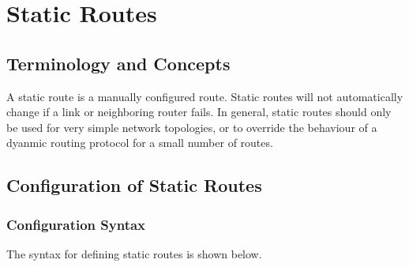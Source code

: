 \chapter{Static Routes}
\label{staticroutes}
\section{Terminology and Concepts}

A static route is a manually configured route.  Static routes will not
automatically change if a link or neighboring router fails.  In
general, static routes should only be used for very simple network
topologies, or to override the behaviour of a dyanmic routing protocol
for a small number of routes.

\section{Configuration of Static Routes}

\subsection{Configuration Syntax}

The syntax for defining static routes is shown below.
\vspace{0.1in}
\noindent{}
\vspace{0.1in}


